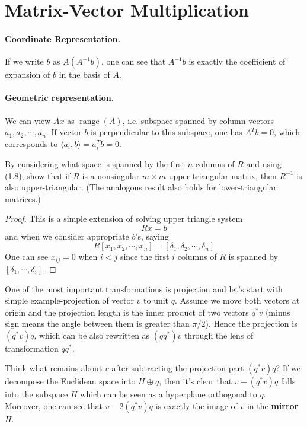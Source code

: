 \documentclass[dvipsnames, 12pt]{article}
\begin{document}
\section{Matrix-Vector Multiplication}


\paragraph{Coordinate Representation.} If we write $b$ as $A(A^{-1}b)$, one can see that $A^{-1}b$ is exactly the coefficient of expansion of $b$ in the basis of $A$.

\paragraph{Geometric representation.} We can view $Ax$ as $\operatorname{range}(A)$, i.e. subspace spanned by column vectors $a_{1}, a_{2}, \cdots, a_{n}$. If vector $b$ is perpendicular to this subspace, one has $A^{T} b =0$, which corresponds to $\langle a_{i}, b\rangle = a_{i}^{T} b =0$.

\begin{problem}{}
     By considering what space is spanned by the first $n$ columns of $R$ and using (1.8), show that if $R$ is a nonsingular $m \times m$ upper-triangular matrix, then $R^{-1}$ is also upper-triangular. (The analogous result also holds for lower-triangular matrices.)
\end{problem}

\begin{proof}
    This is a simple extension of solving upper triangle system
    $$
    Rx = b
    $$
    and when we consider appropriate $b$'s, saying
    $$
    R[x_{1}, x_{2}, \cdots, x_{n}] = [\delta_{1}, \delta_{2}, \cdots, \delta_{n}]
    $$
    One can see $x_{ij} = 0$ when $i<j$ since the first $i$ columns of $R$ is spanned by $[\delta_{1},\cdots, \delta_{i}]$.
\end{proof}

One of the most important transformations is projection and let's start with simple example-projection of vector $v$ to unit $q$. Assume we move both vectors at origin and the projection length is the inner product of two vectors $q^{*}v$ (minus sign means the angle between them is greater than $\pi/2$). Hence the projection is $(q^{*}v) q$, which can be also rewritten as $(qq^{*})v$ through the lens of transformation $qq^{*}$.

Think what remains about $v$ after subtracting the projection part $(q^{*}v) q$? If we decompose the Euclidean space into $H\oplus q$, then it's clear that $v-(q^{*}v) q$ falls into the subspace $H$ which can be seen as a hyperplane orthogonal to $q$. Moreover, one can see that $v-2(q^{*}v)q$ is exactly the image of $v$ in the \textbf{mirror} $H$.
\end{document}
